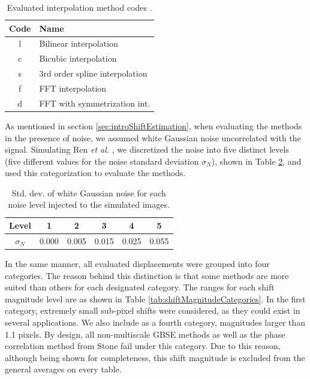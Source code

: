 \begin{table}[htpb]
\begin{minipage}[t]{.25\textwidth}
\label{tab:ApodizationWindows}
\end{minipage}\hspace{0.7em}
\begin{minipage}[t]{.35\textwidth}
\vspace{0pt}
\begin{tabular}{c|l}
Code & Name\\ \hline
l & Bilinear interpolation\\
c & Bicubic interpolation\\
s & 3rd order spline interpolation\\
f & FFT interpolation\\
d & FFT with symmetrization int.\\ \hline	
\end{tabular}
\caption{\scriptsize{Evaluated interpolation method codes \intParam.}}
\label{tab:interpolationMethodsGBSE}
\end{minipage}%
\end{table}

As mentioned in section \ref{sec:introShiftEstimation}, when evaluating the methods in the presence of noise, we assumed white Gaussian noise uncorrelated with the signal. Simulating Ren \emph{et al.} \cite{Ren_2010}, we discretized the noise into five distinct levels (five different values for the noise standard deviation $\sigma_N$), shown in Table \ref{tab:noiseLevels}, and used this categorization to evaluate the methods.

\begin{table}[ht!]
\centering
\begin{tabular}{|c|c|c|c|c|c|} 
	\hline
	Level & 1 & 2 & 3 & 4 & 5\\ \hline
	$\sigma_N$ & 0.000 & 0.005 & 0.015 & 0.025 & 0.055\\ \hline
\end{tabular}
\caption{Std. dev. of white Gaussian noise for each noise level injected to the simulated images.}
\label{tab:noiseLevels}
\end{table}

In the same manner, all evaluated displacements were grouped into four categories. The reason behind this distinction is that some methods are more suited than others for each designated category. The ranges for each shift magnitude level are as shown in Table \ref{tab:shiftMagnitudeCategories}. In the first category, extremely small sub-pixel shifts were considered, as they could exist in several applications. We also include as a fourth category, magnitudes larger than 1.1 pixels. By design, all non-multiscale GBSE methods as well as the phase correlation method from Stone \cite{Stone_2001} fail under this category. Due to this reason, although being shown for completeness, this shift magnitude is excluded from the general averages on every table.

